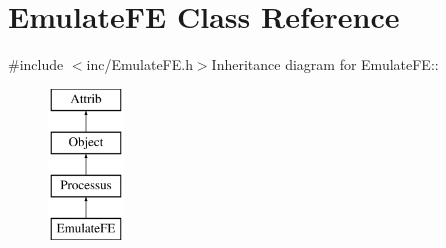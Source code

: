 \hypertarget{classEmulateFE}{
\section{EmulateFE Class Reference}
\label{classEmulateFE}
}


{\ttfamily \#include $<$inc/EmulateFE.h$>$}Inheritance diagram for EmulateFE::\begin{figure}[H]
\begin{center}
\leavevmode
\includegraphics[height=4cm]{classEmulateFE}
\end{center}
\end{figure}
